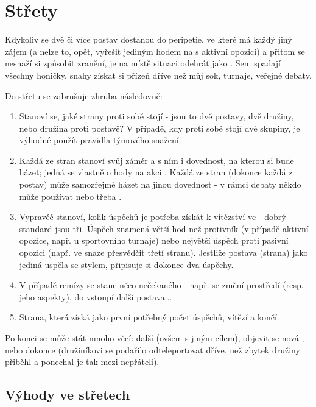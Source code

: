 \section{Střety}
\label{sec:strety}

Kdykoliv se dvě či více postav dostanou do peripetie, ve které má každý jiný zájem (a nelze to, opět, vyřešit jediným hodem na  s aktivní opozicí) a přitom se nesnaží si způsobit zranění, je na místě situaci odehrát jako . Sem spadají všechny honičky, snahy získat si přízeň dříve než můj sok, turnaje, veřejné debaty.

Do střetu se zabrušuje zhruba následovně:
\begin{enumerate}
\item Stanoví se, jaké strany proti sobě stojí - jsou to dvě postavy, dvě družiny, nebo družina proti postavě? V případě, kdy proti sobě stojí dvě skupiny, je výhodné použít pravidla týmového snažení.
\item Každá ze stran stanoví svůj záměr a s ním i dovednost, na kterou si bude házet; jedná se vlastně o hody na akci . Každá ze stran (dokonce každá z postav) může samozřejmě házet na jinou dovednost - v rámci debaty někdo může používat  nebo třeba . 

\item Vypravěč stanoví, kolik úspěchů je potřeba získát k vítězství ve  - dobrý standard jsou tři. Úspěch znamená větší hod než protivník (v případě aktivní opozice, např. u sportovního turnaje) nebo největší úspěch proti pasivní opozici (např. ve snaze přesvědčit třetí stranu). Jestliže postava (strana) jako jediná uspěla se stylem, připisuje si dokonce dva úspěchy.
\item V případě remízy se stane něco nečekaného - např. se změní prostředí (resp. jeho aspekty), do  vstoupí další postava...
\item Strana, která získá jako první potřebný počet úspěchů, vítězí a  končí.
\end{enumerate}

Po konci  se může stát mnoho věcí: další  (ovšem s jiným cílem), objevit se nová , nebo dokonce  (družiníkovi se podařilo odteleportovat dříve, než zbytek družiny přiběhl a ponechal je tak mezi nepřáteli).

\subsection{Výhody ve střetech}
\label{sec:výhody-střety}

